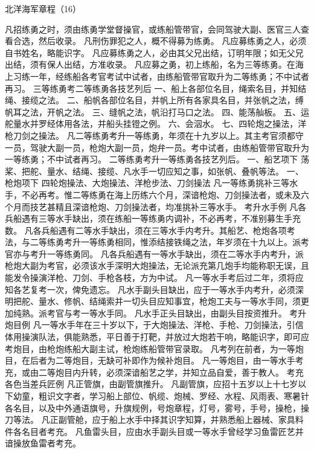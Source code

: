 \documentclass[12pt,UTF8]{ctexbook}
\begin{document}
北洋海军章程（16）

凡招练勇之时，须由练勇学堂督操官，或练船管带官，会同驾驶大副、医官三人查看合选，然后收录。
凡刑伤罪犯之人，概不得募为练勇。
凡应募练勇之人，必须自书姓名，略能识字。
凡应募练勇之人，必由其父兄出结，订明年限；如无父兄出结，须有保人出结，方准收录。
凡应募之勇，初上练船，名为三等练勇。在海上习练一年，经练船各考官考试中试者，由练船管带官取升为二等练勇；不中试者再习。
三等练勇考二等练勇各技艺列后
一、船上各部位名目，绳索名目，并知结绳、接缆之法。
二、船帆各部位名目，并帆上所有各家具名目，并张帆之法，缚帆耳之法，开帆之法。
三、缝帆之法，帆沿打马口之法。
四、能荡舢板。
五、运舵量水并罗经体用各法，并船头挂镫之例。
六、会泅水。
七、四轮炮之操法，洋枪刀剑之操法。
凡二等练勇考升一等练勇，年须在十九岁以上。其主考官须都守一员，驾驶大副一员，枪炮大副一员，炮弁一员。考中试者，由练船管带官取升为一等练勇；不中试者再习。
二等练勇考升一等练勇各技艺列后。
一、船艺项下
荡桨、把舵、量水、结绳、接缆、凡水手一切应知之事，如张帆、叠帆等法。
一、枪炮项下
四轮炮操法、大炮操法、洋枪步法、刀剑操法
凡一等练勇挑补三等水手，不必再考。惟二等练勇在海上历练六个月，深谙枪炮、刀剑操法者，或未及六个月而技艺甚精且深谙枪炮、刀剑操法者，均准挑补三等水手。
考升水手例
凡各兵船遇有三等水手缺出，须在练船一等练勇内调补，不必再考，不准别募生手充数。
凡各兵船遇有二等水手缺出，须在三等水手内考升。其船艺、枪炮各项考法，与二等练勇考升一等练勇相同，惟添结接铁绳之法，年岁须在十九以上。派考官亦与考升一等练勇同。
凡各兵船遇有一等水手缺出，须在二等水手内考升，派枪炮大副为考官，必须该水手深明大炮操法，无论派充第几炮手均能称职无误，且能发令操演洋枪、刀剑、手枪各枝，方为中试。
凡一等水手考后过二年，须将应知各艺复考一次，俾免遗忘。
凡水手副头目缺出，应于一等水手内考升，必须深明把舵、量水、修帆、结绳索并一切头目应知事宜，枪炮工夫与一等水手同，须更加纯熟。派考官与考一等水手同。
凡水手正头目缺出，由副头目按资推升。
考升炮目例
凡一等水手年在三十岁以下，于大炮操法、洋枪、手枪、刀剑操法，引信体用操演队法，俱能熟悉，平日善于打靶，并放过大炮若干响，略能识字，即可应考炮目，由枪炮练船大副主试，枪炮练船管带官录取。
凡考列在前者，为一等炮目，在后者为二等炮目，无缺可补即作为候补炮目。
凡一等炮目，由一等水手考充，或由二等炮目内升转，必须深谙船艺之学，并知立品自爱，善于教人。
考充各色当差兵匠例
凡正管旗，由副管旗推升。
凡副管旗，应招十五岁以上十七岁以下幼童，粗识文字者，学习船上部位、帆缆、炮械、罗经、水程、风雨表、寒暑针各名目，以及中外通语旗号，升旗规例，号炮章程，灯号，雾号，手号，操枪，操刀等法。
凡正副管舱，应于船上水手中择其识字知算，并熟悉船上器械、家具料件各名目者考充。
凡鱼雷头目，应由水手副头目或一等水手曾经学习鱼雷匠艺并谙操放鱼雷者考充。
\end{document}
